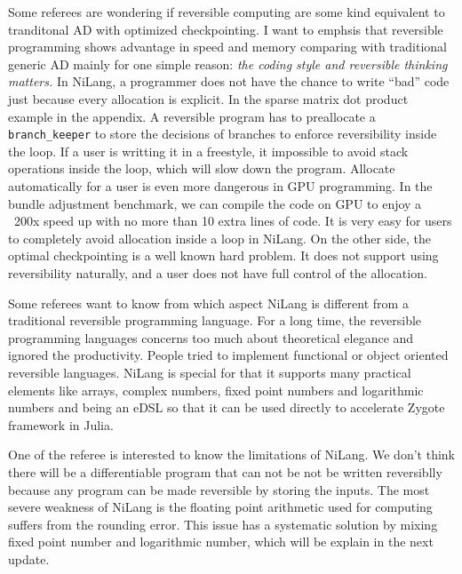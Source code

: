 \documentclass{article}
\begin{document}
Some referees are wondering if reversible computing are some kind equivalent to tranditonal AD with optimized checkpointing.
I want to emphsis that reversible programming shows advantage in speed and memory comparing with traditional generic AD mainly for one simple reason: \textit{the coding style and reversible thinking matters.}
In NiLang, a programmer does not have the chance to write ``bad'' code just because every allocation is explicit.
In the sparse matrix dot product example in the appendix.
A reversible program has to preallocate a \texttt{branch\_keeper} to store the decisions of branches to enforce reversibility inside the loop.
If a user is writting it in a freestyle, it impossible to avoid stack operations inside the loop, which will slow down the program.
Allocate automatically for a user is even more dangerous in GPU programming.
In the bundle adjustment benchmark,
we can compile the code on GPU to enjoy a ~200x speed up with no more than 10 extra lines of code.
It is very easy for users to completely avoid allocation inside a loop in NiLang.
On the other side, the optimal checkpointing is a well known hard problem. It does not support using reversibility naturally, and a user does not have full control of the allocation.

Some referees want to know from which aspect NiLang is different from a traditional reversible programming language.
For a long time, the reversible programming languages concerns too much about theoretical elegance and ignored the productivity. People tried to implement functional or object oriented reversible languages.
NiLang is special for that it supports many practical elements like arrays, complex numbers, fixed point numbers and logarithmic numbers and being an eDSL so that it can be used directly to accelerate Zygote framework in Julia.

One of the referee is interested to know the limitations of NiLang. We don't think there will be a differentiable program that can not be not be written reversiblly because any program can be made reversible by storing the inputs. The most severe weakness of NiLang is the floating point arithmetic used for computing suffers from the rounding error.
This issue has a systematic solution by mixing fixed point number and logarithmic number, which will be explain in the next update.
\end{document}
